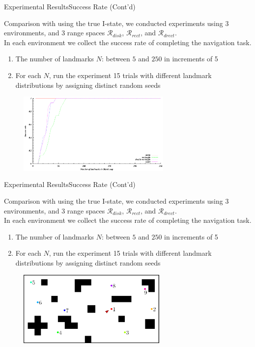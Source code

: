 \documentclass[10pt]{beamer}
\begin{document}
\begin{frame}{Experimental Results}{Success Rate (Cont'd)}
 \small{Comparison with using the true I-state, we conducted experiments using 3
 environments, and 3 range spaces $\mathcal{R}_{disk}$, $\mathcal{R}_{rect}$,
 and  $\mathcal{R}_{drect}$. \\
 In each environment we collect the success rate of completing the navigation
 task. 
 \begin{enumerate}
 \item The number of landmarks $N$: between $5$ and $250$ in increments of 5
 \item For each $N$, run the experiment 15 trials with different landmark
   distributions by assigning distinct random seeds
 \end{enumerate}
}
\begin{figure}
  \centering
  \includegraphics[width=0.67\textwidth]{Data/expnumblank}
\end{figure}
\end{frame}

\begin{frame}{Experimental Results}{Success Rate (Cont'd)}
 \small{Comparison with using the true I-state, we conducted experiments using 3
 environments, and 3 range spaces $\mathcal{R}_{disk}$, $\mathcal{R}_{rect}$,
 and  $\mathcal{R}_{drect}$. \\
 In each environment we collect the success rate of completing the navigation
 task. 
 \begin{enumerate}
 \item The number of landmarks $N$: between $5$ and $250$ in increments of 5
 \item For each $N$, run the experiment 15 trials with different landmark
   distributions by assigning distinct random seeds
 \end{enumerate}
}
\begin{figure}
  \centering
  \includegraphics[width=0.65\textwidth]{figs/clutter}
\end{figure}
\end{frame}
\end{document}
